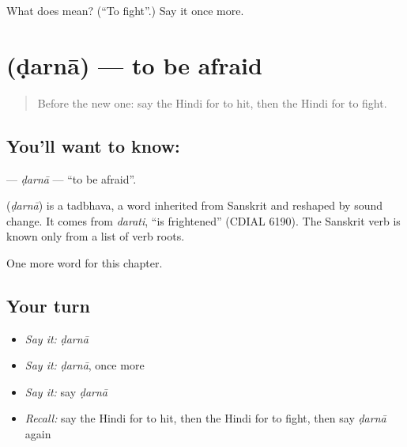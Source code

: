 \begin{tcolorbox}[breakable,colback=teal!4,colframe=teal!35!black,title={Before you move on}]
What does  mean? (\textquotedblleft{}To fight\textquotedblright{}.) Say it once more.
\end{tcolorbox}
\section[\texorpdfstring{\hi{डरना} (ḍarnā)}{डरना (ḍarnā)}]{ (ḍarnā) — to be afraid}

\label{lesson:HI-C178-darna}



\begin{quote}
Before the new one: say the Hindi for to hit, then the Hindi for to fight.
\end{quote}

\subsection*{You'll want to know: }
\textbf{} — \emph{ḍarnā} — \textquotedblleft{}to be afraid\textquotedblright{}.

\begin{cousinweb}
\textbf{} (\emph{ḍarnā}) is a tadbhava, a word inherited from Sanskrit and reshaped by sound change. It comes from \emph{darati}, \textquotedblleft{}is frightened\textquotedblright{} (CDIAL 6190). The Sanskrit verb is known only from a list of verb roots.
\end{cousinweb}

\begin{grammarlens}[title={What you've built}]
One more word for this chapter.
\end{grammarlens}

\subsection*{Your turn}
\begin{itemize}
\raggedright
  \item \emph{Say it:} \emph{ḍarnā}
  \item \emph{Say it:} \emph{ḍarnā}, once more
  \item \emph{Say it:} say \emph{ḍarnā}
  \item \emph{Recall:} say the Hindi for to hit, then the Hindi for to fight, then say \emph{ḍarnā} again
\end{itemize}

